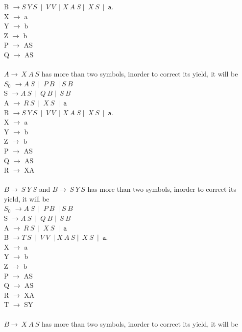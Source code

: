 \documentclass[a4page]{exam}
\newcommand{\Str}[1]{\mathtt{#1}}
\begin{document}
\begin{questions}
    B $\rightarrow S\ Y \ S\ \mid\ V\ V\ \mid X \ A \ S \mid \ X \ S \ \mid \ \Str{a}$.\\
X $\rightarrow$ a\\
Y $\rightarrow$ b\\
Z $\rightarrow$ b\\
P $\rightarrow$ AS\\
Q $\rightarrow$ AS\\
\\
$A \rightarrow \ X \ A \ S $ has more than two symbols, inorder to correct its yield, it will be\\
$S_{0}$ $\rightarrow A \ S \ \mid \ P \ B \ \mid S \ B $\\
S $\rightarrow A\ S\ \mid \ Q \ B \mid \ S \ B   $\\
    A $\rightarrow \ R\ S\ \mid\  X \ S \ \mid\ \Str{a}$ \\
    B $\rightarrow S\ Y \ S\ \mid\ V\ V\ \mid X \ A \ S \mid \ X \ S \ \mid \ \Str{a}$.\\
X $\rightarrow$ a\\
Y $\rightarrow$ b\\
Z $\rightarrow$ b\\
P $\rightarrow$ AS\\
Q $\rightarrow$ AS\\
R $\rightarrow$ XA\\
\\
$B \rightarrow \ S \ Y \ S $  and $B \rightarrow \ S \ Y \ S $ has more than two symbols, inorder to correct its yield, it will be\\
$S_{0}$ $\rightarrow A \ S \ \mid \ P \ B \ \mid S \ B $\\
S $\rightarrow A\ S\ \mid \ Q \ B \mid \ S \ B   $\\
    A $\rightarrow \ R\ S\ \mid\  X \ S \ \mid\ \Str{a}$ \\
    B $\rightarrow T \ S\ \mid\ V\ V\ \mid X \ A \ S \mid \ X \ S \ \mid \ \Str{a}$.\\
X $\rightarrow$ a\\
Y $\rightarrow$ b\\
Z $\rightarrow$ b\\
P $\rightarrow$ AS\\
Q $\rightarrow$ AS\\
R $\rightarrow$ XA\\
T $\rightarrow$ SY\\
\\
$B \rightarrow \ X \ A \ S $ has more than two symbols, inorder to correct its yield, it will be\\

\end{questions}
\end{document}
